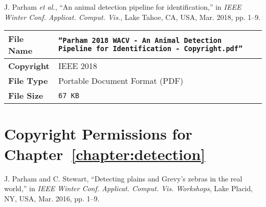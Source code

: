 \begin{tcolorbox}
    J. Parham \textit{et al.}, ``An animal detection pipeline for identification,'' in \textit{IEEE Winter Conf. Applicat. Comput. Vis.}, Lake Tahoe, CA, USA, Mar. 2018, pp. 1–9.
\end{tcolorbox}

\begin{table*}[!ht]
    \begin{center}
        \begin{tabular}{| l | p{13.5cm} |}
            \hline
            \textbf{File Name} & \texttt{``Parham 2018 WACV - An Animal Detection Pipeline for Identification - Copyright.pdf''} \\
            \hline
            \textbf{Copyright} & IEEE 2018                                                                                       \\
            \hline
            \textbf{File Type} & Portable Document Format (PDF)                                                                  \\
            \hline
            \textbf{File Size} & \texttt{67 KB}                                                                                  \\
            \hline
        \end{tabular}
    \end{center}
\end{table*}

\newpage

\section{Copyright Permissions for Chapter~\ref{chapter:detection}}

\begin{tcolorbox}
    J. Parham and C. Stewart, ``Detecting plains and Grevy’s zebras in the real world,'' in \textit{IEEE Winter Conf. Applicat. Comput. Vis. Workshops}, Lake Placid, NY, USA, Mar. 2016, pp. 1–9.
\end{tcolorbox}

